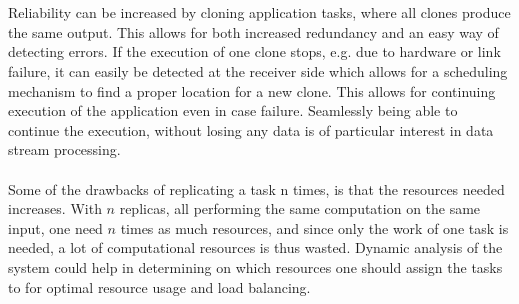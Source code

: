 \documentclass{cslthse-msc}
\begin{document}
\\\\
Reliability can be increased by cloning application tasks, where all clones produce the same output. This allows for both increased redundancy and an easy way of detecting errors. If the execution of one clone stops, e.g. due to hardware or link failure, it can easily be detected at the receiver side which allows for a scheduling mechanism to find a proper location for a new clone. This allows for continuing execution of the application even in case failure. Seamlessly being able to continue the execution, without losing any data is of particular interest in data stream processing.
\\\\
Some of the drawbacks of replicating a task n times, is that the resources needed increases. With $n$ replicas, all performing the same computation on the same input, one need $n$ times as much resources, and since only the work of one task is needed, a lot of computational resources is thus wasted. Dynamic analysis of the system could help in determining on which resources one should assign the tasks to for optimal resource usage and load balancing. 
\end{document}
